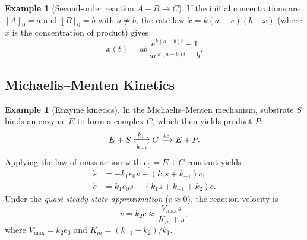 \documentclass[12pt,a4paper,openany]{book}
\theoremstyle{definition}
\newtheorem{example}[definition]{Example}
\theoremstyle{plain}
\theoremstyle{remark}
\begin{document}
\begin{example}[Second-order reaction $A+B\to C$]
\label{ex:second-order-reaction}
If the initial concentrations are $[A]_{0}=a$ and $[B]_{0}=b$ with
$a\neq b$, the rate law $\dot{x}=k(a-x)(b-x)$ (where $x$ is the
concentration of product) gives
\[
  x(t) = ab\,\frac{e^{k(a-b)t}-1}{ae^{k(a-b)t}-b}.
\]
\end{example}

\subsection{Michaelis--Menten Kinetics}
\label{subsec:michaelis-menten}

\begin{example}[Enzyme kinetics]
\label{ex:michaelis-menten}
In the Michaelis--Menten mechanism, substrate $S$ binds an enzyme $E$
to form a complex $C$, which then yields product $P$:
\[
  E + S \xrightleftharpoons[k_{-1}]{k_{1}} C \xrightarrow{k_{2}} E + P.
\]
Applying the law of mass action with $e_{0}=E+C$ constant yields
\begin{align*}
  \dot{s} &= -k_{1}e_{0}s + (k_{1}s+k_{-1})c, \\
  \dot{c} &= k_{1}e_{0}s - (k_{1}s+k_{-1}+k_{2})c.
\end{align*}
Under the \emph{quasi-steady-state approximation}
($\dot{c}\approx 0$), the reaction velocity is
\[
  v = k_{2}c \approx \frac{V_{\max}s}{K_{m}+s},
\]
where $V_{\max}=k_{2}e_{0}$ and $K_{m}=(k_{-1}+k_{2})/k_{1}$.
\end{example}

\begin{center}
\end{center}
\end{document}
